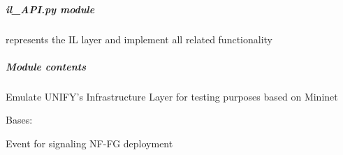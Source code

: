 \documentclass[letterpaper,10pt,english]{sphinxmanual}
\begin{document}
\subparagraph{\emph{il\_API.py} module}
\label{infr/il_API::doc}\label{infr/il_API:il-api-py-module}
{\hyperref[infr/il_API:escape.infr.il_API.InfrastructureLayerAPI]{\emph{}}} represents the IL layer and implement all
related functionality


\subparagraph{Module contents}
\label{infr/il_API:module-contents}\label{infr/il_API:module-escape.infr.il_API}
Emulate UNIFY's Infrastructure Layer for testing purposes based on Mininet

\begin{fulllineitems}
\label{infr/il_API:escape.infr.il_API.DeploymentFinishedEvent}
Bases: 

Event for signaling NF-FG deployment

\begin{fulllineitems}
\label{infr/il_API:escape.infr.il_API.DeploymentFinishedEvent.__init__}
\end{fulllineitems}


\end{fulllineitems}

\end{document}
